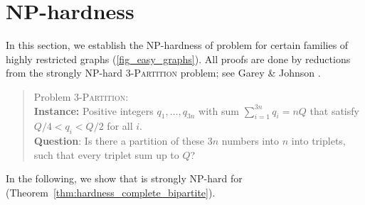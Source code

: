 \section{NP-hardness}
\label{sec:hardness-chapter-6}
In this section, we establish the NP-hardness of problem {\xxxNTP} for certain families of
highly restricted graphs (\cref{fig_easy_graphs}). 
All proofs are done by reductions from the strongly NP-hard \textsc{3-Partition} problem;
see Garey \& Johnson \cite{garey1979computers}. 
\begin{quote}
Problem \textsc{3-Partition}: 
\\
\textbf{Instance:} Positive integers $q_1,\ldots,q_{3n}$ with sum $\sum_{i=1}^{3n}q_i=nQ$ that satisfy 
$Q/4<q_i<Q/2$ for all $i$.
\\
\textbf{Question}: Is there a partition of these $3n$ numbers into $n$ into triplets, such that  
every triplet sum up to $Q$?  
\end{quote}
In the following, we show that {\xxxNTP} is strongly NP-hard for  (Theorem~\ref{thm:hardness_complete_bipartite}). 
